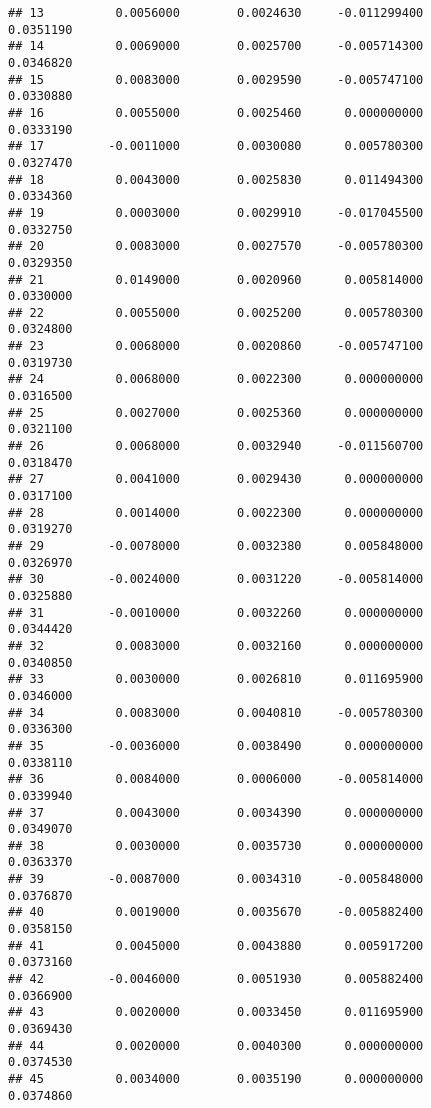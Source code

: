 \documentclass[
]{article}
\begin{document}
\begin{verbatim}
## 13          0.0056000        0.0024630     -0.011299400             0.0351190
## 14          0.0069000        0.0025700     -0.005714300             0.0346820
## 15          0.0083000        0.0029590     -0.005747100             0.0330880
## 16          0.0055000        0.0025460      0.000000000             0.0333190
## 17         -0.0011000        0.0030080      0.005780300             0.0327470
## 18          0.0043000        0.0025830      0.011494300             0.0334360
## 19          0.0003000        0.0029910     -0.017045500             0.0332750
## 20          0.0083000        0.0027570     -0.005780300             0.0329350
## 21          0.0149000        0.0020960      0.005814000             0.0330000
## 22          0.0055000        0.0025200      0.005780300             0.0324800
## 23          0.0068000        0.0020860     -0.005747100             0.0319730
## 24          0.0068000        0.0022300      0.000000000             0.0316500
## 25          0.0027000        0.0025360      0.000000000             0.0321100
## 26          0.0068000        0.0032940     -0.011560700             0.0318470
## 27          0.0041000        0.0029430      0.000000000             0.0317100
## 28          0.0014000        0.0022300      0.000000000             0.0319270
## 29         -0.0078000        0.0032380      0.005848000             0.0326970
## 30         -0.0024000        0.0031220     -0.005814000             0.0325880
## 31         -0.0010000        0.0032260      0.000000000             0.0344420
## 32          0.0083000        0.0032160      0.000000000             0.0340850
## 33          0.0030000        0.0026810      0.011695900             0.0346000
## 34          0.0083000        0.0040810     -0.005780300             0.0336300
## 35         -0.0036000        0.0038490      0.000000000             0.0338110
## 36          0.0084000        0.0006000     -0.005814000             0.0339940
## 37          0.0043000        0.0034390      0.000000000             0.0349070
## 38          0.0030000        0.0035730      0.000000000             0.0363370
## 39         -0.0087000        0.0034310     -0.005848000             0.0376870
## 40          0.0019000        0.0035670     -0.005882400             0.0358150
## 41          0.0045000        0.0043880      0.005917200             0.0373160
## 42         -0.0046000        0.0051930      0.005882400             0.0366900
## 43          0.0020000        0.0033450      0.011695900             0.0369430
## 44          0.0020000        0.0040300      0.000000000             0.0374530
## 45          0.0034000        0.0035190      0.000000000             0.0374860

\end{verbatim}
\end{document}
